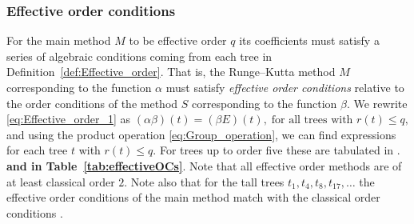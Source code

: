 \subsubsection{Effective order conditions}\label{sec:effOrderCond}

For the main method $M$ to be effective order $q$ its coefficients must satisfy a series of algebraic conditions coming from each tree in Definition~\ref{def:Effective_order}.
That is, the Runge--Kutta method $M$ corresponding to the function $\alpha$ must satisfy
\emph{effective order conditions} relative to the order conditions of the
method $S$ corresponding to the function $\beta$.
We rewrite \eqref{eq:Effective_order_1} as
$
	(\alpha\beta)(t) = (\beta E)(t), \; \text{for all trees with $r(t) \leq q$,}
$
and using the product operation \eqref{eq:Group_operation}, we can find expressions for each tree $t$ with $r(t) \leq q$.
For trees up to order five these are tabulated in \cite[Table~3.89]{Butcher2008_book}.
\textbf{and in Table~\ref{tab:effectiveOCs}}.
Note that all effective order methods are of at least classical order $2$.
Note also that for the tall trees $t_1, t_4, t_8, t_{17}, \dots$ the
effective order conditions of the main method match with the classical
order conditions \cite{Butcher2008_book}.
